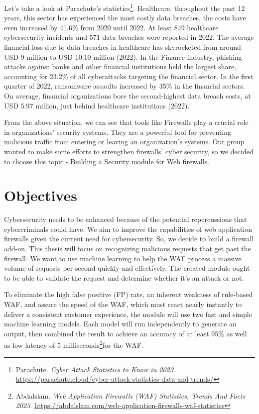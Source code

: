 Let's take a look at Parachute's statistics\footnote{Parachute. \textit{Cyber Attack Statistics to Know in 2023}. \url{https://parachute.cloud/cyber-attack-statistics-data-and-trends/}}. Healthcare, throughout the past 12 years, this sector has experienced the most costly data breaches, the costs have even increased by 41.6\% from 2020 until 2022. At least 849 healthcare cybersecurity incidents and 571 data breaches were reported in 2022. The average financial loss due to data breaches in healthcare has skyrocketed from around USD 9 million to USD 10.10 million (2022). In the Finance industry, phishing attacks against banks and other financial institutions held the largest share, accounting for 23.2\% of all cyberattacks targeting the financial sector. In the first quarter of 2022, ransomware assaults increased by 35\% in the financial sectors. On average, financial organizations bore the second-highest data breach costs, at USD 5.97 million, just behind healthcare institutions (2022). 

From the above situation, we can see that tools like Firewalls play a crucial role in organizations' security systems. They are a powerful tool for preventing malicious traffic from entering or leaving an organization’s systems. Our group wanted to make some efforts to strengthen firewalls' cyber security, so we decided to choose this topic - Building a Security module for Web firewalls.
\newpage
\section{Objectives}
\label{sec:objectives}
Cybersecurity needs to be enhanced because of the potential repercussions that cybercriminals could have. We aim to improve the capabilities of web application firewalls given the current need for cybersecurity. So, we decide to build a firewall add-on. This thesis will focus on recognizing malicious requests that get past the firewall. We want to use machine learning to help the WAF process a massive volume of requests per second quickly and effectively. The created module ought to be able to validate the request and determine whether it's an attack or not.

To eliminate the high false positive (FP) rate, an inherent weakness of rule-based WAF, and assure the speed of the WAF, which must react nearly instantly to deliver a consistent customer experience, the module will use two fast and simple machine learning models. Each model will run independently to generate an output, then combined the result to achieve an accuracy of at least 95\% as well as low latency of 5 milliseconds\footnote{Abdalslam. \textit{Web Application Firewalls (WAF) Statistics, Trends And Facts 2023}. 
\url{https://abdalslam.com/web-application-firewalls-waf-statistics}}for the WAF.

